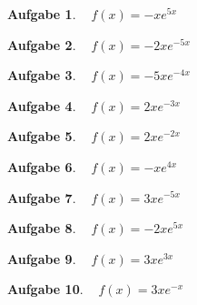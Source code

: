 \documentclass[12pt]{article}
\theoremstyle{note}
\newtheorem{aufgabe}{Aufgabe}
\begin{document}
\begin{flushleft}
\begin{aufgabe} ~  
$f(x)=$$- x e^{5 x}$
\end{aufgabe}\vspace{1em}\begin{aufgabe} ~  
$f(x)=$$- 2 x e^{- 5 x}$
\end{aufgabe}\vspace{1em}\begin{aufgabe} ~  
$f(x)=$$- 5 x e^{- 4 x}$
\end{aufgabe}\vspace{1em}\begin{aufgabe} ~  
$f(x)=$$2 x e^{- 3 x}$
\end{aufgabe}\vspace{1em}\begin{aufgabe} ~  
$f(x)=$$2 x e^{- 2 x}$
\end{aufgabe}\vspace{1em}\begin{aufgabe} ~  
$f(x)=$$- x e^{4 x}$
\end{aufgabe}\vspace{1em}\begin{aufgabe} ~  
$f(x)=$$3 x e^{- 5 x}$
\end{aufgabe}\vspace{1em}\begin{aufgabe} ~  
$f(x)=$$- 2 x e^{5 x}$
\end{aufgabe}\vspace{1em}\begin{aufgabe} ~  
$f(x)=$$3 x e^{3 x}$
\end{aufgabe}\vspace{1em}\begin{aufgabe} ~  
$f(x)=$$3 x e^{- x}$
\end{aufgabe}\vspace{1em}
\end{flushleft} 
\end{document}
